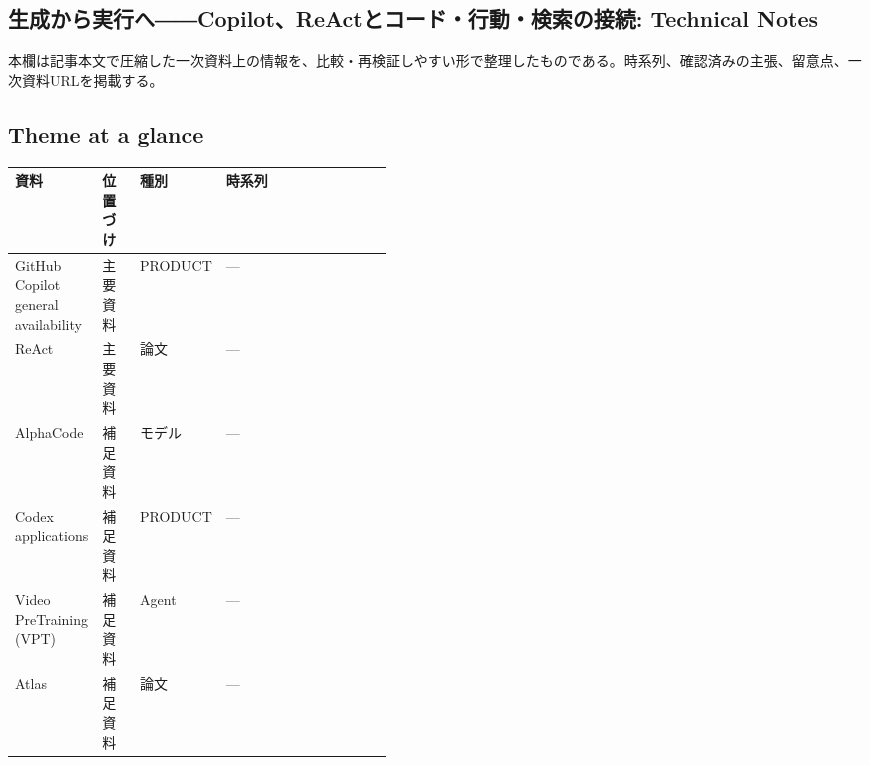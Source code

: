 \subsection*{生成から実行へ――Copilot、ReActとコード・行動・検索の接続: Technical Notes}
本欄は記事本文で圧縮した一次資料上の情報を、比較・再検証しやすい形で整理したものである。時系列、確認済みの主張、留意点、一次資料URLを掲載する。
\medskip
\subsection*{Theme at a glance}
\begin{center}
\footnotesize
\begin{tabularx}{\linewidth}{@{}p{0.20\linewidth}p{0.10\linewidth}p{0.14\linewidth}X@{}}
\toprule
資料 & 位置づけ & 種別 & 時系列 \\
\midrule
GitHub Copilot general availability & 主要資料 & PRODUCT & — \\
ReAct & 主要資料 & 論文 & — \\
AlphaCode & 補足資料 & モデル & — \\
Codex applications & 補足資料 & PRODUCT & — \\
Video PreTraining (VPT) & 補足資料 & Agent & — \\
Atlas & 補足資料 & 論文 & — \\
\bottomrule
\end{tabularx}
\end{center}
\normalsize

